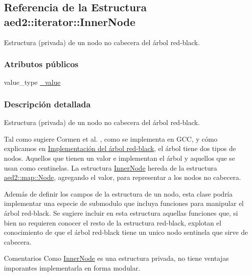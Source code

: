 \hypertarget{structaed2_1_1iterator_1_1InnerNode}{\subsection{\-Referencia de la \-Estructura aed2\-:\-:iterator\-:\-:\-Inner\-Node}
\label{structaed2_1_1iterator_1_1InnerNode}
}


\-Estructura (privada) de un nodo no cabecera del árbol red-\/black.  


\subsubsection*{\-Atributos públicos}
\begin{DoxyCompactItemize}
\item 
value\-\_\-type \hyperlink{structaed2_1_1iterator_1_1InnerNode_a3d80723a2dd1b746c0687f39fbc3d5e2_a3d80723a2dd1b746c0687f39fbc3d5e2}{\-\_\-value}
\end{DoxyCompactItemize}


\subsubsection{\-Descripción detallada}
\-Estructura (privada) de un nodo no cabecera del árbol red-\/black. 

\-Tal como sugiere \-Cormen et al. \cite{CormenLeisersonRivestStein2009}, como se implementa en \-G\-C\-C, y cómo explicamos en \hyperlink{Implementacion}{\-Implementación del árbol red-\/black}, el árbol tiene dos tipos de nodos. \-Aquellos que tienen un valor e implementan el árbol y aquellos que se usan como centinelas. \-La estructura \hyperlink{structaed2_1_1iterator_1_1InnerNode}{\-Inner\-Node} hereda de la estructura \hyperlink{structaed2_1_1map_1_1Node}{aed2\-::map\-::\-Node}, agregando el valor, para representar a los nodos no cabecera.

\-Además de definir los campos de la estructura de un nodo, esta clase podría implementar una especie de submodulo que incluya funciones para manipular el árbol red-\/black. \-Se sugiere incluir en esta estructura aquellas funciones que, si bien no requieren conocer el resto de la estructura red-\/black, explotan el conocimiento de que el árbol red-\/black tiene un unico nodo sentinela que sirve de cabecera.

\begin{DoxyRemark}{\-Comentarios}
\-Como \hyperlink{structaed2_1_1iterator_1_1InnerNode}{\-Inner\-Node} es una estructura privada, no tiene ventajas imporantes implementarla en forma modular. 
\end{DoxyRemark}


